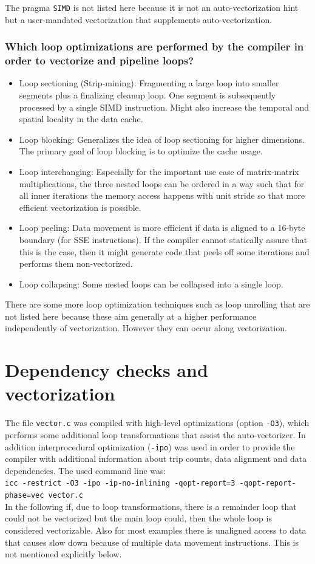 \documentclass[11pt]{article}
\begin{document}
The pragma \texttt{SIMD} is not listed here because it is not an auto-vectorization hint but a user-mandated vectorization that supplements auto-vectorization.

\subsubsection*{Which loop optimizations are performed by the compiler in order to vectorize and pipeline loops?}
\begin{itemize}
\item Loop sectioning (Strip-mining): Fragmenting a large loop into smaller segments plus a finalizing cleanup loop. One segment is subsequently processed by a single SIMD instruction. Might also increase the temporal and spatial locality in the data cache.
\item Loop blocking: Generalizes the idea of loop sectioning for higher dimensions. The primary goal of loop blocking is to optimize the cache usage.
\item Loop interchanging: Especially for the important use case of matrix-matrix multiplications, the three nested loops can be ordered in a way such that for all inner iterations the memory access happens with unit stride so that more efficient vectorization is possible.
\item Loop peeling: Data movement is more efficient if data is aligned to a 16-byte boundary (for SSE instructions). If the compiler cannot statically assure that this is the case, then it might generate code that peels off some iterations and performs them non-vectorized.
\item Loop collapsing: Some nested loops can be collapsed into a single loop.
\end{itemize}

There are some more loop optimization techniques such as loop unrolling that are not listed here because these aim generally at a higher performance independently of vectorization. However they can occur along vectorization.

\section{Dependency checks and vectorization}

The file \texttt{vector.c} was compiled with high-level optimizations (option \texttt{-O3}), which performs some additional loop transformations that assist the auto-vectorizer. In addition interprocedural optimization (\texttt{-ipo}) was used in order to provide the compiler with additional information about trip counts, data alignment and data dependencies. The used command line was:\\
\texttt{icc -restrict -O3 -ipo -ip-no-inlining -qopt-report=3 -qopt-report-phase=vec vector.c}\\
In the following if, due to loop transformations, there is a remainder loop that could not be vectorized but the main loop could, then the whole loop is considered vectorizable. Also for most examples there is unaligned access to data that causes slow down because of multiple data movement instructions. This is not mentioned explicitly below.
\end{document}
